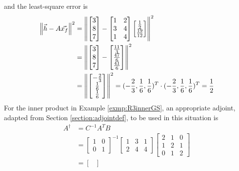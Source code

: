 \begin{solution}
and the least-square error is
\begin{align*}
\norm{\vec{h}-A\vec{x_f}}^2 &=
\norm{\begin{bmatrix}
3 \\
8 \\
7
\end{bmatrix}-
\begin{bmatrix}
1 & 2 \\
3 & 4 \\
1 & 4
\end{bmatrix}
\begin{bmatrix}
\frac{1}{2} \\
\frac{19}{12}
\end{bmatrix}
}^2 \\
&= 
\norm{\begin{bmatrix}
3 \\
8 \\
7
\end{bmatrix}-
\begin{bmatrix}
\frac{11}{3}\\
\frac{47}{6}\\ 
\frac{41}{6}
\end{bmatrix}
}^2 \\
&= 
\norm{\begin{bmatrix}-\frac{2}{3}\\ 
\frac{1}{6}\\ 
\frac{1}{6}\end{bmatrix}}^2 = (-\frac{2}{3}, \frac{1}{6}, \frac{1}{6})^T \cdot (-\frac{2}{3}, \frac{1}{6}, \frac{1}{6})^T = \frac{1}{2}
\end{align*}
For the inner product in Example \ref{exmp:R3innerGS}, an appropriate adjoint, adapted from Section \ref{section:adjointdef}, to be used in this situation is
\begin{align*}
A^\dag &= C^{-1} A^T B \\
&=
\begin{bmatrix}
1 & 0 \\
0 & 1
\end{bmatrix}^{-1}
\begin{bmatrix}
1 & 3 & 1\\
2 & 4 & 4
\end{bmatrix}
\begin{bmatrix}
2&1&0\\ 
1&2&1\\
0&1&2
\end{bmatrix} \\
&=
\begin{bmatrix}

\end{bmatrix}
\end{align*}
\end{solution}
